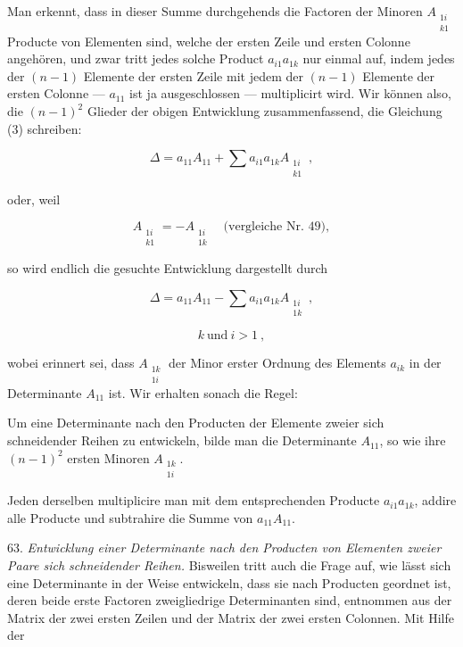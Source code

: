 \documentclass[11pt]{article}
\providecommand{\weberpage}[1]{}
\providecommand{\weq}[2]{\begin{equation}\tag{#1}#2\end{equation}}
\let\Delta\varDelta
\begin{document}
Man erkennt, dass in dieser Summe durchgehends die Factoren der Minoren $A_{\substack{1i\\k1}}$
Producte von Elementen sind, welche der ersten Zeile und ersten Colonne angeh\"oren, und zwar
tritt jedes solche Product $a_{i1}a_{1k}$ nur einmal auf, indem jedes der $(n-1)$ Elemente der
ersten Zeile mit jedem der $(n-1)$ Elemente der ersten Colonne --- $a_{11}$ ist ja
ausgeschlossen --- multiplicirt wird. Wir k\"onnen also, die $(n-1)^2$ Glieder der obigen
Entwicklung zusammenfassend, die Gleichung (3) schreiben:

\weq{4}{\Delta = a_{11}A_{11} + \sum a_{i1}a_{1k}A_{\substack{1i\\k1}}\ ,}

oder, weil

\[
A_{\substack{1i\\k1}} = -A_{\substack{1i\\1k}}\quad \text{(vergleiche Nr. 49)},
\]

so wird endlich die gesuchte Entwicklung dargestellt durch

\weq{5}{\Delta = a_{11}A_{11} - \sum a_{i1}a_{1k}A_{\substack{1i\\1k}}\ ,}

\[
k\ \text{und}\ i > 1\ ,
\]

wobei erinnert sei, dass $A_{\substack{1k\\1i}}$ der Minor erster Ordnung des Elements
$a_{ik}$ in der Determinante $A_{11}$ ist. Wir erhalten sonach die Regel:

\glqq Um eine Determinante nach den Producten der Elemente zweier sich schneidender Reihen zu
entwickeln, bilde man die Determinante $A_{11}$, so wie ihre $(n-1)^2$ ersten Minoren
$A_{\substack{1k\\1i}}$.

Jeden derselben multiplicire man mit dem entsprechenden Producte $a_{i1}a_{1k}$, addire alle
Producte und subtrahire die Summe von $a_{11}A_{11}$\grqq{}.

63. \textit{Entwicklung einer Determinante nach den Producten von Elementen zweier Paare
sich schneidender Reihen.} Bisweilen tritt auch die Frage auf, wie l\"asst sich eine
Determinante in der Weise entwickeln, dass sie nach Producten geordnet ist, deren beide erste
Factoren zweigliedrige Determinanten sind, entnommen aus der Matrix der zwei ersten Zeilen
und der Matrix der zwei ersten Colonnen. Mit Hilfe der


\weberpage{69}
\end{document}
